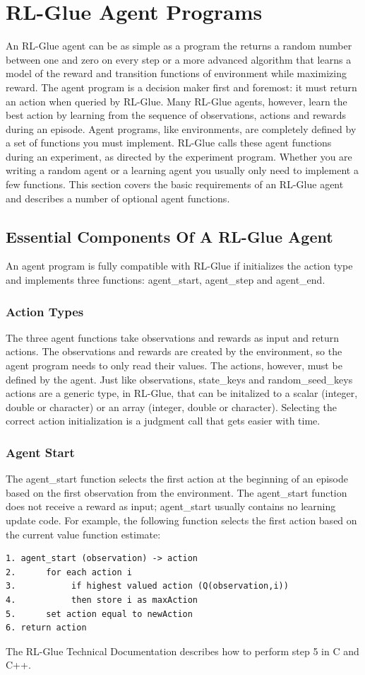 \documentclass[11pt]{article}
\begin{document}
\section{RL-Glue Agent Programs}
\label{agent}
An RL-Glue agent can be as simple as a program the returns a random number between one and zero on every step or a more advanced algorithm that learns a model of the reward and transition functions of environment while maximizing reward. The agent program is a decision maker first and foremost: it must return an action when queried by RL-Glue. Many RL-Glue agents, however, learn the best action by learning from the sequence of observations, actions and rewards during an episode. Agent programs, like environments, are completely defined by a set of functions you must implement. RL-Glue calls these agent functions during an experiment, as directed by the experiment program. Whether you are writing a random agent or a learning agent you usually only need  to implement a few functions. This section covers the basic requirements of an RL-Glue agent and describes a number of optional agent functions.
\subsection{Essential Components Of A RL-Glue Agent}
\label{agentp1}

An agent program is fully compatible with RL-Glue if initializes the action type and implements three functions: agent\_start, agent\_step and agent\_end. 

\subsubsection{Action Types}
The three agent functions take observations and rewards as input and return actions. The observations and rewards are created by the environment, so the agent program needs to only read their values. The actions, however, must be defined by the agent. Just like observations, state\_keys and random\_seed\_keys actions are a generic type, in RL-Glue, that can be initalized to a scalar (integer, double or character) or an array (integer, double or character). Selecting the correct action initialization is a judgment call that gets easier with time.

\subsubsection{Agent Start}
The agent\_start function selects the first action at the beginning of an episode based on the first observation from the environment. The agent\_start function does not receive a reward as input; agent\_start usually contains no learning update code. For example, the following function selects the first action based on the current value function estimate:
\begin{verbatim}
1. agent_start (observation) -> action
2.      for each action i
3.           if highest valued action (Q(observation,i))
4.           then store i as maxAction
5.      set action equal to newAction
6. return action
\end{verbatim}
The RL-Glue Technical Documentation describes how to perform step 5 in C and C++. 
\end{document}

